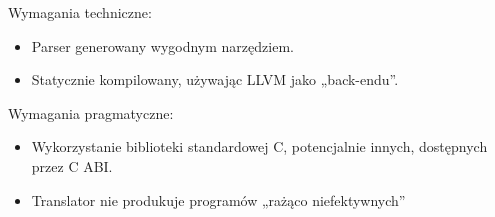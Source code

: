 Wymagania techniczne:
\begin{itemize}[noitemsep]
    \item Parser generowany wygodnym narzędziem.
    \item Statycznie kompilowany, używając LLVM jako „back-endu”.
\end{itemize}

Wymagania pragmatyczne:
\begin{itemize}[noitemsep]
    \item Wykorzystanie biblioteki standardowej C, potencjalnie innych, dostępnych przez C ABI.
    \item Translator nie produkuje programów „rażąco niefektywnych”
\end{itemize}